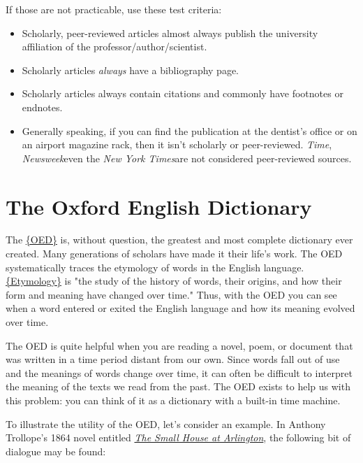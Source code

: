 {If those are not practicable, use these test criteria:
\begin{itemize}
\item Scholarly, peer-reviewed articles almost always publish the university 
affiliation of the professor/author/scientist. 

\item Scholarly articles \emph{always} have a bibliography page. 

\item Scholarly articles always contain citations and commonly have footnotes 
or endnotes. 

\item Generally speaking, if you can find the publication at the dentist's 
office or on an airport magazine rack, then it isn't scholarly or 
peer-reviewed. \emph{Time}, \emph{Newsweek}\textemdash even the \emph{New York 
Times}\textemdash are not considered peer-reviewed sources.
\end{itemize}

\section{The Oxford English Dictionary}

The \href{http://www.oed.com.ezproxy.bu.edu}{\{OED\}} is, without question, the 
greatest and most complete dictionary ever created. Many generations of 
scholars have made it their life's work. The OED systematically traces the 
etymology of words in the English language. 
\href{http://en.wikipedia.org/wiki/Etymology}{\{Etymology\}} is "the study of 
the history of words, their origins, and how their form and meaning have 
changed over time." Thus, with the OED you can see when a word entered or 
exited the English language and how its meaning evolved over time. 

The OED is quite helpful when you are reading a novel, poem, or document that 
was written in a time period distant from our own. Since words fall out of use 
and the meanings of words change over time, it can often be difficult to 
interpret the meaning of the texts we read from the past. The OED exists to 
help us with this problem: you can think of it as a dictionary with a built-in 
time machine. 

To illustrate the utility of the OED, let's consider an example. In Anthony 
Trollope's 1864 novel entitled 
\href{http://www.gutenberg.org/files/4599/4599-h/4599-h.htm#c2}{\emph{The Small 
House at Arlington}}, the following bit of dialogue may be found:

}
